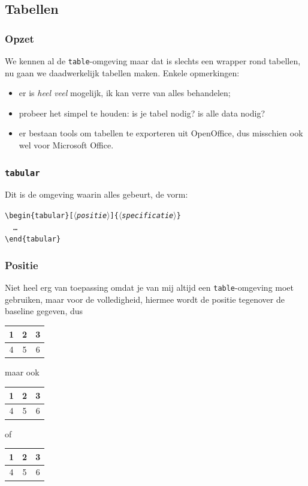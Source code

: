 \subsection{Tabellen}
\begin{frame}[fragile]
  \frametitle{Opzet}

  We kennen al de \verb|table|-omgeving maar dat is slechts een wrapper rond tabellen, nu gaan we daadwerkelijk tabellen maken. Enkele opmerkingen:
  \begin{itemize}
    \item er is \emph{heel veel} mogelijk, ik kan verre van alles behandelen;
    \item probeer het simpel te houden: is je tabel nodig? is alle data nodig?
    \item er bestaan tools om tabellen te exporteren uit OpenOffice, dus misschien ook wel voor Microsoft Office.
  \end{itemize}
\end{frame}

\begin{frame}
  \frametitle{\texttt{tabular}}

  Dit is de omgeving waarin alles gebeurt, de vorm:

  \texttt{\textcolor{uagreen}{\textbackslash begin}\{tabular\}[$\langle$\textsl{positie}$\rangle$]\{$\langle$\textsl{specificatie}$\rangle$\}} \\
  \ \ \texttt{\ldots} \\
  \texttt{\textcolor{uagreen}{\textbackslash end}\{tabular\}}
\end{frame}

\begin{frame}[fragile]
  \frametitle{Positie}

  Niet heel erg van toepassing omdat je van mij altijd een \verb|table|-omgeving moet gebruiken, maar voor de volledigheid, hiermee wordt de positie tegenover de baseline gegeven, dus
  \begin{tabular}[b]{ccc}
    1 & 2 & 3 \\\midrule
    4 & 5 & 6
  \end{tabular}
  maar ook
  \begin{tabular}[c]{ccc}
    1 & 2 & 3 \\\midrule
    4 & 5 & 6
  \end{tabular}
  of
  \begin{tabular}[t]{ccc}
    1 & 2 & 3 \\\midrule
    4 & 5 & 6
  \end{tabular}
\end{frame}

